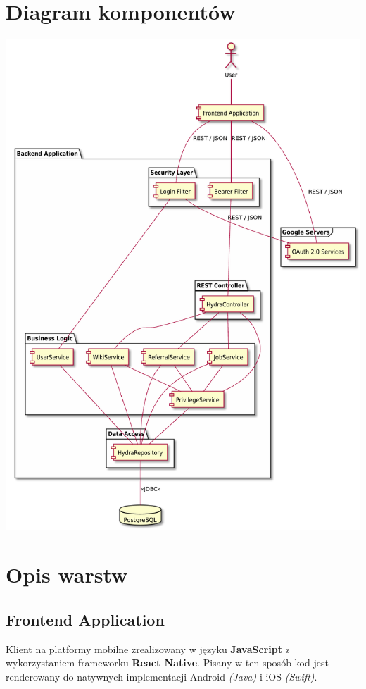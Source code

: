 \documentclass{scrreprt}
\begin{document}
\section{Diagram komponentów}
\includegraphics[width=\textwidth, keepaspectratio]{graphics/hydra_component_diagram.pdf}

\section{Opis warstw}
\subsection{Frontend Application}
Klient na platformy mobilne zrealizowany w języku \textbf{JavaScript} z wykorzystaniem frameworku \textbf{React Native}.
Pisany w ten sposób kod jest renderowany do natywnych implementacji Android \textit{(Java)} i iOS \textit{(Swift)}.
\end{document}
